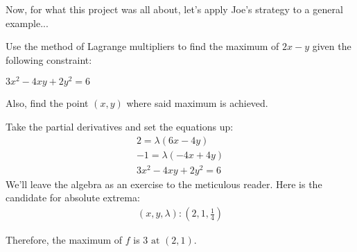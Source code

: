 Now, for what this project was all about, let's apply Joe's strategy to a general example...
\begin{eg}
	Use the method of Lagrange multipliers to find the maximum of $2x-y$ given the following constraint:
	\begin{center}
		$3x^2-4xy+2y^2=6$
	\end{center}
	Also, find the point $(x, y)$ where said maximum is achieved.
\end{eg}
Take the partial derivatives and set the equations up:
\begin{align*}
	2 = \lambda (6x-4y)\\
	-1 = \lambda (-4x+4y)\\
	3x^2-4xy+2y^2=6
\end{align*}
We'll leave the algebra as an exercise to the meticulous reader.
Here is the candidate for absolute extrema:
\begin{align*}
	(x, y, \lambda): \left(2, 1, \frac{1}{4}\right)
\end{align*}

Therefore, the maximum of $f$ is $\boxed{3\text{ at }(2, 1)}$.